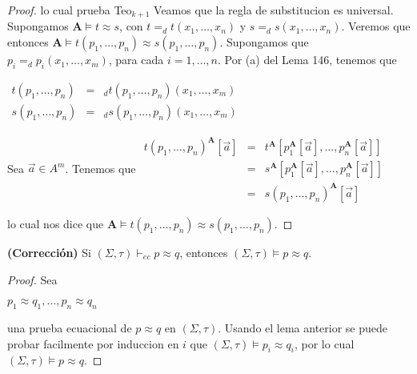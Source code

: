 \begin{proof}
    lo cual prueba Teo$_{k+1}$
    Veamos que la regla de substitucion es universal. Supongamos $\mathbf{A} \models t\approx s$, con $t=_{d}t(x_{1}, \dotsc, x_{n})$ y $ s=_{d}s(x_{1}, \dotsc, x_{n})$. Veremos que entonces $\mathbf{A}\models t(p_{1}, \dotsc, p_{n})\approx s(p_{1}, \dotsc, p_{n}).$ Supongamos que $ p_{i}=_{d}p_{i}(x_{1}, \dotsc, x_{m})$, para cada $i=1, \dotsc, n.$ Por (a) del Lema 146, tenemos que

    $\displaystyle \begin{array}{rcl} t(p_{1}, \dotsc, p_{n}) & =& _{d}t(p_{1}, \dotsc, p_{n})(x_{1}, \dotsc, x_{m}) \\ s(p_{1}, \dotsc, p_{n}) & =& _{d}s(p_{1}, \dotsc, p_{n})(x_{1}, \dotsc, x_{m}) \end{array} $

    Sea $\vec{a}\in A^{m}$. Tenemos que
    $\displaystyle \begin{array}{rcl} t(p_{1}, \dotsc, p_{n})^{\mathbf{A}}\left\lbrack \vec{a}\right\rbrack & = & t^{\mathbf{A}} \left\lbrack p_{1}^{\mathbf{A}}\left\lbrack \vec{a}\right\rbrack , \dotsc, p_{n}^{\mathbf{A}}\left\lbrack \vec{a}\right\rbrack \right\rbrack \\ & = & s^{\mathbf{A}}\left\lbrack p_{1}^{\mathbf{A}}\left\lbrack \vec{a}\right\rbrack , \dotsc, p_{n}^{\mathbf{A}}\left\lbrack \vec{a}\right\rbrack \right\rbrack \\ & = & s(p_{1}, \dotsc, p_{n})^{\mathbf{A}}\left\lbrack \vec{a}\right\rbrack \end{array} $

    lo cual nos dice que $\mathbf{A}\models t(p_{1}, \dotsc, p_{n})\approx s(p_{1}, \dotsc, p_{n})$.
  \end{proof}

  \begin{theorem}
    \PN \textbf{(Corrección)} Si $(\Sigma, \tau) \vdash_{ec} p \approx q$, entonces $(\Sigma, \tau) \models p \approx q$.
  \end{theorem}
  \begin{proof}
    Sea

    $\displaystyle p_{1}\approx q_{1}, \dotsc, p_{n}\approx q_{n} $

    una prueba ecuacional de $p\approx q$ en $(\Sigma, \tau).$ Usando el lema anterior se puede probar facilmente por induccion en $i$ que $(\Sigma, \tau)\models p_{i}\approx q_{i}$, por lo cual $(\Sigma, \tau)\models p\approx q. $
  \end{proof}

